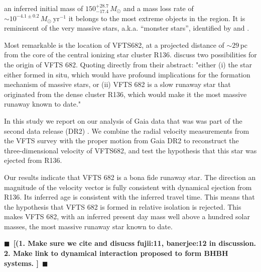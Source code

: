 \documentclass[apjl,twocolumn]{emulateapj}
\newcommand{\todo}[1]{{\large $\blacksquare$~\textbf{\color{red}[#1]}}~$\blacksquare$}
\begin{document}
{ an inferred initial mass of $150^{+28.7}_{-17.4}\,M_\odot$  and a mass loss rate of  $\sim10^{-4.1\pm0.2}\,M_\odot \ \mathrm{yr}^{-1}$  \citep[][]{bestenlehner:11,schneider:18} it belongs to the most extreme objects in the region.  It is reminiscent of the very  massive stars, a.k.a. ``monster stars'', identified by  \citet{Crowther+2010} and \citet{Crowther+2016}. 
 
Most remarkable is the location of  VFTS682, at a projected distance of $\sim$$29$\,pc from the core of the central ionizing star cluster R136.   \citet{bestenlehner:11} discuss two possibilities for the  origin of VFTS 682. Quoting directly from their abstract:  "either (i) the star either formed in situ, which would have profound implications for the formation mechanism of massive stars, or (ii) VFTS 682 is a slow runaway star that originated from the dense cluster R136, which would make it the most massive runaway known to date."   

In this study we report on our analysis of Gaia data that was was part of the second data release (DR2) \cite[][]{gaia:16,brown:18}.  We combine the radial velocity measurements from the VFTS survey \citep[][]{evans:11} with the proper motion from Gaia DR2 to reconstruct the three-dimensional velocity of VFTS682, and test the hypothesis that this star was ejected from R136. 

Our results indicate that VFTS 682 is a bona fide runaway star.  The direction an magnitude of the velocity vector is fully consistent with dynamical ejection from R136.  Its inferred age is consistent with the inferred travel time. This means that the hypothesis that VFTS 682 is formed in relative isolation is rejected.  This makes VFTS 682, with an inferred present day mass well above a hundred solar masses, the most massive runaway star known to date. 
}

\todo{(1. Make sure we cite and disucss fujii:11, banerjee:12 in discussion. 2. Make link to dynamical interaction proposed to form BHBH systems. }
\end{document}
